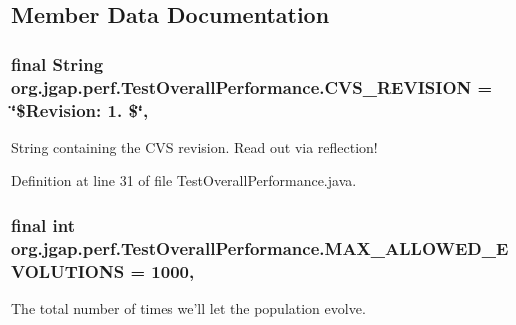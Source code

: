 \subsection{Member Data Documentation}
\hypertarget{classorg_1_1jgap_1_1perf_1_1_test_overall_performance_ac41c91455d9fdd78203f0464c6c71727}{
\subsubsection[{C\-V\-S\-\_\-\-R\-E\-V\-I\-S\-I\-O\-N}]{\setlength{\rightskip}{0pt plus 5cm}final String org.\-jgap.\-perf.\-Test\-Overall\-Performance.\-C\-V\-S\-\_\-\-R\-E\-V\-I\-S\-I\-O\-N = \char`\"{}\$Revision\-: 1. \$\char`\"{}\hspace{0.3cm}{\ttfamily [static]}, {\ttfamily [private]}}}\label{classorg_1_1jgap_1_1perf_1_1_test_overall_performance_ac41c91455d9fdd78203f0464c6c71727}
String containing the C\-V\-S revision. Read out via reflection! 

Definition at line 31 of file Test\-Overall\-Performance.\-java.

\hypertarget{classorg_1_1jgap_1_1perf_1_1_test_overall_performance_aa9b50c87546cbebd930aa4e91b4dfec6}{
\subsubsection[{M\-A\-X\-\_\-\-A\-L\-L\-O\-W\-E\-D\-\_\-\-E\-V\-O\-L\-U\-T\-I\-O\-N\-S}]{\setlength{\rightskip}{0pt plus 5cm}final int org.\-jgap.\-perf.\-Test\-Overall\-Performance.\-M\-A\-X\-\_\-\-A\-L\-L\-O\-W\-E\-D\-\_\-\-E\-V\-O\-L\-U\-T\-I\-O\-N\-S = 1000\hspace{0.3cm}{\ttfamily [static]}, {\ttfamily [private]}}}\label{classorg_1_1jgap_1_1perf_1_1_test_overall_performance_aa9b50c87546cbebd930aa4e91b4dfec6}
The total number of times we'll let the population evolve. 

